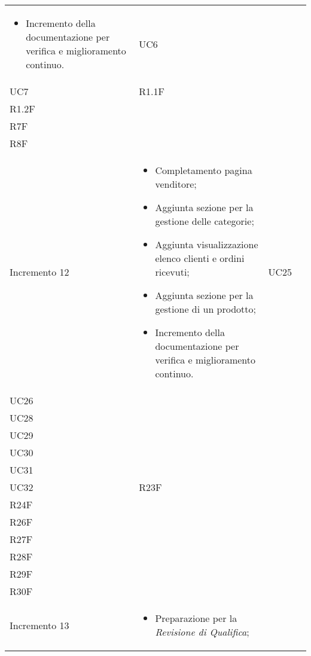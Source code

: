 \begin{longtable}{
    >{\centering}p{}
    >{\raggedright}p{}
    >{\centering}p{}
    >{\centering}p{}
    }
\begin{itemize}
        \item Incremento della documentazione per verifica e miglioramento continuo.
    \end{itemize}     & UC6                                                                                                                                                                                      \\ UC7 & R1.1F \\ R1.2F \\ R7F \\ R8F
    \tabularnewline
    Incremento 12                 & \vspace{-15px}
    \begin{itemize}
        \renewcommand\labelitemi{-}
        \item Completamento pagina venditore;
        \item Aggiunta sezione per la gestione delle categorie;
        \item Aggiunta visualizzazione elenco clienti e ordini ricevuti;
        \item Aggiunta sezione per la gestione di un prodotto;
        \item Incremento della documentazione per verifica e miglioramento continuo.
    \end{itemize}     & UC25                                                                                                                                                                                     \\ UC26 \\ UC28 \\ UC29 \\ UC30 \\ UC31 \\ UC32 & R23F \\ R24F \\ R26F \\ R27F \\ R28F \\ R29F \\ R30F
    \tabularnewline
    Incremento 13                 &
    \vspace{-15px}
    \begin{itemize}
        \renewcommand\labelitemi{-}
        \item Preparazione per la \textit{Revisione di Qualifica};

\end{itemize}
\end{longtable}
